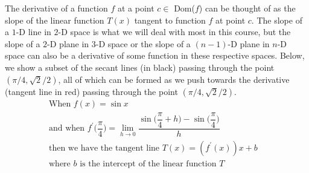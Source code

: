 \begin{example}
The derivative of a function $f$ at a point $c \in$ Dom($f$) can be thought of as the slope of the linear function $T(x)$ tangent to function $f$ at point $c$. The slope of a $1$-D line in $2$-D space is what we will deal with most in this course, but the slope of a $2$-D plane in $3$-D space or the slope of a $(n-1)$-D plane in $n$-D space can also be a derivative of some function in these respective spaces. Below, we show a subset of the secant lines (in black) passing through the point $(\pi/4, \sqrt{2}/2)$, all of which can be formed as we push towards the derivative (tangent line in red) passing through the point $(\pi/4, \sqrt{2}/2)$.
\begin{align*}
    &\text{When} \hspace{4pt} f(x) = \sin x\\[2ex]
    &\text{and when} \hspace{4pt} f^{'}\Big(\dfrac{\pi}{4}\Big) = \lim_{h \longrightarrow 0} \dfrac{\sin\Big(\dfrac{\pi}{4} + h\Big) - \sin\Big(\dfrac{\pi}{4}\Big)}{h}\\[2ex]
    &\text{then we have the tangent line} \hspace{4pt} T(x) = (f^{'}(x))x + b \hspace{20pt}\\[2ex]
    &\text{where $b$ is the intercept of the linear function $T$}
\end{align*}


\end{example}
